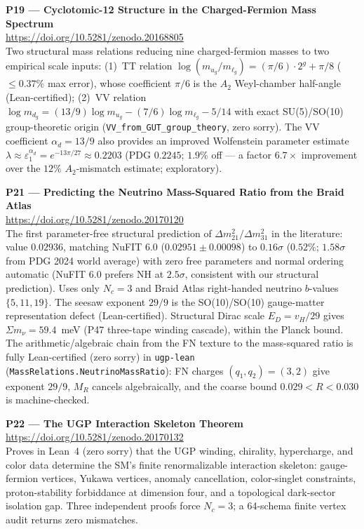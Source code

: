 \documentclass[11pt]{article}
\begin{document}
\medskip
\noindent\textbf{P19 — Cyclotomic-12 Structure in the Charged-Fermion Mass
Spectrum}~\cite{Spivack2026_CyclotomicMass}\\
\url{https://doi.org/10.5281/zenodo.20168805}\\
Two structural mass relations reducing nine charged-fermion masses to two
empirical scale inputs: (1)~TT relation $\log(m_{u_g}/m_{\ell_g}) = (\pi/6)\cdot2^g + \pi/8$
($\le 0.37\%$ max error), whose coefficient $\pi/6$ is the $A_2$ Weyl-chamber
half-angle (Lean-certified); (2)~VV relation $\log m_{d_g} = (13/9)\log m_{u_g}
- (7/6)\log m_{\ell_g} - 5/14$ with exact SU(5)/SO(10) group-theoretic origin
(\texttt{VV\_from\_GUT\_group\_theory}, zero sorry).
The VV coefficient $\alpha_d = 13/9$ also provides an improved Wolfenstein parameter
estimate $\lambda \approx \varepsilon_1^{\alpha_d} = e^{-13\pi/27} \approx 0.2203$
(PDG $0.2245$; $1.9\%$ off --- a factor $6.7\times$ improvement over the
$12\%$ $A_2$-mismatch estimate; exploratory).

\medskip
\noindent\textbf{P21 — Predicting the Neutrino Mass-Squared Ratio from the
Braid Atlas}~\cite{SpivackNeutrino}\\
\url{https://doi.org/10.5281/zenodo.20170120}\\
The first parameter-free structural prediction of $\Delta m^2_{21}/\Delta m^2_{31}$
in the literature: value $0.02936$, matching NuFIT 6.0 ($0.02951 \pm 0.00098$) to $0.16\sigma$ ($0.52\%$; $1.58\sigma$ from PDG 2024 world average)
with zero free parameters and normal ordering automatic (NuFIT 6.0 prefers NH at $2.5\sigma$, consistent with our structural prediction).  Uses only $N_c = 3$
and Braid Atlas right-handed neutrino $b$-values $\{5,11,19\}$.  The seesaw
exponent $29/9$ is the SO(10)/SO(10) gauge-matter representation defect
(Lean-certified).  Structural Dirac scale $E_D = v_H/29$ gives
$\Sigma m_\nu = 59.4$~meV (P47 three-tape winding cascade), within the Planck bound.
The arithmetic/algebraic chain from the FN texture to the mass-squared ratio is
fully Lean-certified (zero sorry) in \texttt{ugp-lean}
(\texttt{MassRelations.NeutrinoMassRatio}): FN charges $(q_1,q_2)=(3,2)$ give
exponent $29/9$, $M_R$ cancels algebraically, and the coarse bound
$0.029 < R < 0.030$ is machine-checked.

\medskip
\noindent\textbf{P22 — The UGP Interaction Skeleton Theorem}~\cite{Spivack2026_UGPDynamics}\\
\url{https://doi.org/10.5281/zenodo.20170132}\\
Proves in Lean~4 (zero sorry) that the UGP winding, chirality, hypercharge,
and color data determine the SM's finite renormalizable interaction skeleton:
gauge-fermion vertices, Yukawa vertices, anomaly cancellation, color-singlet
constraints, proton-stability forbiddance at dimension four, and a topological
dark-sector isolation gap.  Three independent proofs force $N_c = 3$; a 64-schema
finite vertex audit returns zero mismatches.
\end{document}
